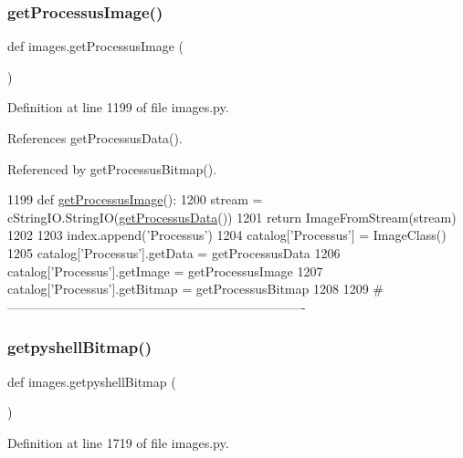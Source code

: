 \subsubsection{\texorpdfstring{get\+Processus\+Image()}{getProcessusImage()}}
{\footnotesize\ttfamily def images.\+get\+Processus\+Image (\begin{DoxyParamCaption}{ }\end{DoxyParamCaption})}



Definition at line 1199 of file images.\+py.



References get\+Processus\+Data().



Referenced by get\+Processus\+Bitmap().


\begin{DoxyCode}
1199 \textcolor{keyword}{def }\hyperlink{namespaceimages_a6c329db2429a821439f24528acc6ad29}{getProcessusImage}():
1200     stream = cStringIO.StringIO(\hyperlink{namespaceimages_add9d06810f66b7f5621d259a3a02df09}{getProcessusData}())
1201     \textcolor{keywordflow}{return} ImageFromStream(stream)
1202 
1203 index.append(\textcolor{stringliteral}{'Processus'})
1204 catalog[\textcolor{stringliteral}{'Processus'}] = ImageClass()
1205 catalog[\textcolor{stringliteral}{'Processus'}].getData = getProcessusData
1206 catalog[\textcolor{stringliteral}{'Processus'}].getImage = getProcessusImage
1207 catalog[\textcolor{stringliteral}{'Processus'}].getBitmap = getProcessusBitmap
1208 
1209 \textcolor{comment}{#----------------------------------------------------------------------}
\end{DoxyCode}
\mbox{\label{namespaceimages_a09ec6a51e2a48611d87400f71f606d42}} 
\subsubsection{\texorpdfstring{getpyshell\+Bitmap()}{getpyshellBitmap()}}
{\footnotesize\ttfamily def images.\+getpyshell\+Bitmap (\begin{DoxyParamCaption}{ }\end{DoxyParamCaption})}



Definition at line 1719 of file images.\+py.



